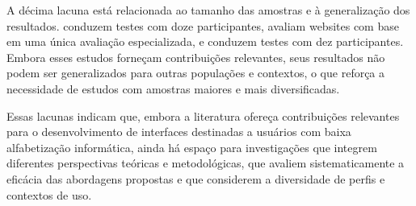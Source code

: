 A décima lacuna está relacionada ao tamanho das amostras e à generalização dos resultados. \cite{gatsou2017seniors} conduzem testes com doze participantes, \cite{dombrovskaia2021guideline} avaliam websites com base em uma única avaliação especializada, e \cite{xie2010usability} conduzem testes com dez participantes. Embora esses estudos forneçam contribuições relevantes, seus resultados não podem ser generalizados para outras populações e contextos, o que reforça a necessidade de estudos com amostras maiores e mais diversificadas.

Essas lacunas indicam que, embora a literatura ofereça contribuições relevantes para o desenvolvimento de interfaces destinadas a usuários com baixa alfabetização informática, ainda há espaço para investigações que integrem diferentes perspectivas teóricas e metodológicas, que avaliem sistematicamente a eficácia das abordagens propostas e que considerem a diversidade de perfis e contextos de uso.